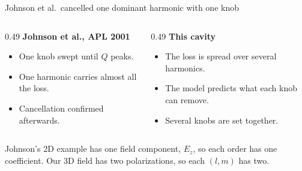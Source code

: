 \documentclass[11pt, aspectratio=169]{beamer}
\begin{document}
\begin{frame}{Johnson et al.\ cancelled one dominant harmonic with one knob}
    \vspace{0.15cm}
    \begin{columns}[T]
        \begin{column}{0.49\textwidth}
            \textbf{Johnson et al., APL 2001}
            \vspace{0.25cm}
            \begin{itemize}
                \setlength{\itemsep}{0.20cm}
                \item One knob swept until $Q$ peaks.
                \item One harmonic carries almost all the loss.
                \item Cancellation confirmed afterwards.
            \end{itemize}
        \end{column}
        \begin{column}{0.49\textwidth}
            \textbf{This cavity}
            \vspace{0.25cm}
            \begin{itemize}
                \setlength{\itemsep}{0.20cm}
                \item The loss is spread over several harmonics.
                \item The model predicts what each knob can remove.
                \item Several knobs are set together.
            \end{itemize}
        \end{column}
    \end{columns}
    \vfill
    {\footnotesize Johnson's 2D example has one field component, $E_z$, so each order has one coefficient. Our 3D field has two polarizations, so each $(l,m)$ has two.}
    \vspace{0.10cm}
\end{frame}
\end{document}
